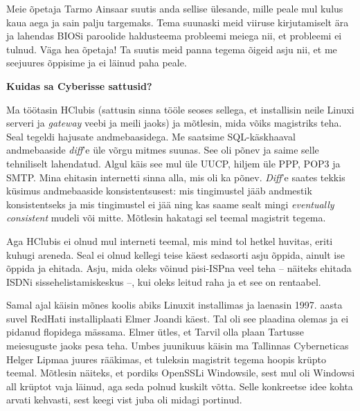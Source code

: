 Meie õpetaja Tarmo Ainsaar suutis anda sellise ülesande, mille peale mul kulus kaua aega ja
sain palju targemaks. Tema suunaski meid viiruse kirjutamiselt ära ja lahendas BIOSi
paroolide haldusteema probleemi meiega nii, et probleemi ei tulnud. Väga hea
õpetaja! Ta suutis meid panna tegema õigeid asju nii, et me seejuures õppisime
ja ei läinud paha peale.

\textbf{Kuidas sa Cyberisse sattusid?}

Ma töötasin HClubis (sattusin sinna tööle seoses sellega, et
installisin neile Linuxi serveri ja \emph{gateway} veebi ja meili jaoks) ja
mõtlesin, mida võiks magistriks teha. Seal tegeldi hajusate andmebaasidega.
Me saatsime SQL-käskhaaval andmebaaside \emph{diff}'e üle võrgu mitmes suunas.
See oli põnev ja saime selle tehniliselt lahendatud. Algul käis see mul üle
UUCP, hiljem üle PPP, POP3 ja SMTP. Mina ehitasin internetti sinna alla, mis oli
ka põnev. \emph{Diff}'e saates tekkis küsimus andmebaaside
konsistentsusest: mis tingimustel jääb andmestik konsistentseks ja mis tingimustel ei jää ning kas saame sealt mingi \emph{eventually consistent} mudeli 
või mitte. Mõtlesin hakatagi sel teemal magistrit tegema.

Aga HClubis ei olnud mul interneti teemal, mis mind tol hetkel huvitas, eriti
kuhugi areneda. Seal ei olnud kellegi teise käest sedasorti asju õppida, ainult
ise õppida ja ehitada. Asju, mida oleks võinud pisi-ISPna veel teha --
näiteks ehitada ISDNi sissehelistamiskeskus --, kui oleks leitud raha ja et see on
rentaabel.

Samal ajal käisin mõnes koolis abiks Linuxit installimas ja laenasin 1997. aasta suvel
RedHati installiplaati Elmer Joandi
käest. Tal oli see plaadina olemas ja ei pidanud
flopidega mässama. Elmer ütles, et Tarvil olla plaan
Tartusse meiesuguste jaoks pesa teha. Umbes juunikuus käisin ma
Tallinnas Cyberneticas Helger Lipmaa  juures rääkimas, et tuleksin magistrit tegema hoopis krüpto teemal. Mõtlesin näiteks,
et pordiks OpenSSLi Windowsile, sest
mul oli Windowsi all krüptot vaja läinud, aga seda polnud kuskilt võtta. Selle
konkreetse idee kohta arvati kehvasti, sest keegi vist juba oli midagi portinud.

